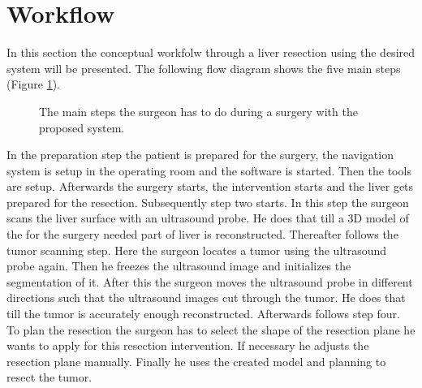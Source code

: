 \section{Workflow}
In this section the conceptual workfolw through a liver resection using the
desired system will be presented. The following flow diagram shows the five main
steps (Figure \ref{fig:conceptWorkflow}).
\begin{figure}[H]
  \centering
  \caption{The main steps the surgeon has to do during a surgery with the
    proposed system.}
  \label{fig:conceptWorkflow}
\end{figure}
In the preparation step the patient is prepared for the surgery, the
navigation system is setup in the operating room and the software is started.
Then the tools are setup. Afterwards the surgery starts, the intervention starts and the liver gets
prepared for the resection. Subsequently step two starts. In this step the
surgeon scans the liver surface with an ultrasound probe. He does that till a 3D
model of the for the surgery needed part of liver is reconstructed. Thereafter
follows the tumor scanning step. Here the surgeon locates a tumor using the
ultrasound probe again. Then he freezes the ultrasound image and initializes the
segmentation of it. After this the surgeon moves the ultrasound probe in
different directions such that the ultrasound images cut through the tumor. He
does that till the tumor is accurately enough reconstructed. Afterwards follows
step four. To plan the resection the surgeon has to select the shape of the
resection plane he wants to apply for this resection intervention. If necessary
he adjusts the resection plane manually. Finally he uses the created model and
planning to resect the tumor. 



